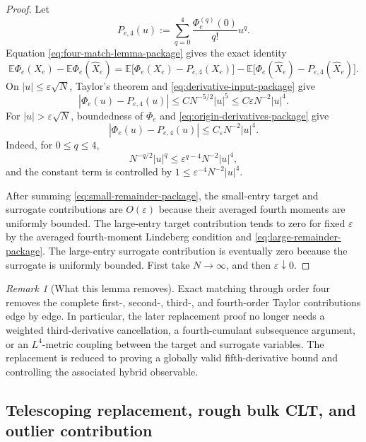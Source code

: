 \documentclass[11pt]{article}
\theoremstyle{definition}
\theoremstyle{remark}
\newtheorem{remark}[theorem]{Remark}
\newcommand{\E}{\mathbb E}
\begin{document}
\begin{proof}
Let
\[
 P_{e,4}(u):=\sum_{q=0}^4\frac{\Phi_e^{(q)}(0)}{q!}u^q.
\]
Equation \eqref{eq:four-match-lemma-package} gives the exact identity
\[
 \E\Phi_e(X_e)-\E\Phi_e(\widehat X_e)
 =\E\bigl[\Phi_e(X_e)-P_{e,4}(X_e)\bigr]
 -\E\bigl[\Phi_e(\widehat X_e)-P_{e,4}(\widehat X_e)\bigr].
\]
On $|u|\le\varepsilon\sqrt N$, Taylor's theorem and
\eqref{eq:derivative-input-package} give
\begin{equation}\label{eq:small-remainder-package}
 |\Phi_e(u)-P_{e,4}(u)|
 \le C N^{-5/2}|u|^5
 \le C\varepsilon N^{-2}|u|^4.
\end{equation}
For $|u|>\varepsilon\sqrt N$, boundedness of $\Phi_e$ and
\eqref{eq:origin-derivatives-package} give
\begin{equation}\label{eq:large-remainder-package}
 |\Phi_e(u)-P_{e,4}(u)|
 \le C_\varepsilon N^{-2}|u|^4.
\end{equation}
Indeed, for $0\le q\le4$,
\[
 N^{-q/2}|u|^q
 \le\varepsilon^{q-4}N^{-2}|u|^4,
\]
and the constant term is controlled by
$1\le\varepsilon^{-4}N^{-2}|u|^4$.

After summing \eqref{eq:small-remainder-package}, the small-entry target and
surrogate contributions are $O(\varepsilon)$ because their averaged fourth
moments are uniformly bounded.  The large-entry target contribution tends to
zero for fixed $\varepsilon$ by the averaged fourth-moment Lindeberg
condition and \eqref{eq:large-remainder-package}.  The large-entry surrogate
contribution is eventually zero because the surrogate is uniformly bounded.
First take $N\to\infty$, and then $\varepsilon\downarrow0$.
\end{proof}

\begin{remark}[What this lemma removes]
Exact matching through order four removes the complete first-, second-, third-,
and fourth-order Taylor contributions edge by edge.  In particular, the later
replacement proof no longer needs a weighted third-derivative cancellation, a
fourth-cumulant subsequence argument, or an $L^4$-metric coupling between the
target and surrogate variables.  The replacement is reduced to proving a
globally valid fifth-derivative bound and controlling the associated hybrid
observable.
\end{remark}

\subsection{Telescoping replacement, rough bulk CLT, and outlier contribution}
\end{document}
